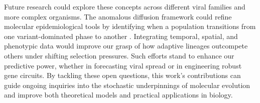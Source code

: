 Future research could explore these concepts across different viral families and more complex organisms. The anomalous diffusion framework could refine molecular epidemiological tools by identifying when a population transitions from one variant-dominated phase to another \cite{Ho2011}. Integrating temporal, spatial, and phenotypic data would improve our grasp of how adaptive lineages outcompete others under shifting selection pressures. Such efforts stand to enhance our predictive power, whether in forecasting viral spread or in engineering robust gene circuits. By tackling these open questions, this work's contributions can guide ongoing inquiries into the stochastic underpinnings of molecular evolution and improve both theoretical models and practical applications in biology.


\vfill

\pagebreak



